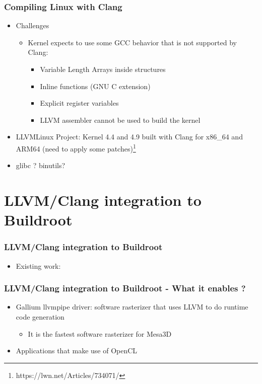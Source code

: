 \documentclass{beamer}
\begin{document}
\begin{frame}
\frametitle{Compiling Linux with Clang}
\begin{itemize}
  \item Challenges
  \begin{itemize}
    \item Kernel expects to use some GCC behavior that is not supported by Clang:
    \begin{itemize}
      \item Variable Length Arrays inside structures
      \item Inline functions (GNU C extension)
      \item Explicit register variables
      \item LLVM assembler cannot be used to build the kernel
    \end{itemize}
  \end{itemize}
  \item LLVMLinux Project: Kernel 4.4 and 4.9 built with Clang for x86\_64 and ARM64 (need to apply some patches)\footnote{https://lwn.net/Articles/734071/}
  \item glibc ? binutils?
\end{itemize}
\end{frame}
\section{LLVM/Clang integration to Buildroot}

\begin{frame}
\frametitle{LLVM/Clang integration to Buildroot}
\begin{itemize}
  \item Existing work:
\end{itemize}
\end{frame}

\begin{frame}
\frametitle{LLVM/Clang integration to Buildroot - What it enables ?}
\begin{itemize}
  \item Gallium llvmpipe driver: software rasterizer that uses LLVM to do runtime code generation
  \begin{itemize}
    \item It is the fastest software rasterizer for Mesa3D
  \end{itemize}
  \item Applications that make use of OpenCL
\end{itemize}
\end{frame}
\end{document}
